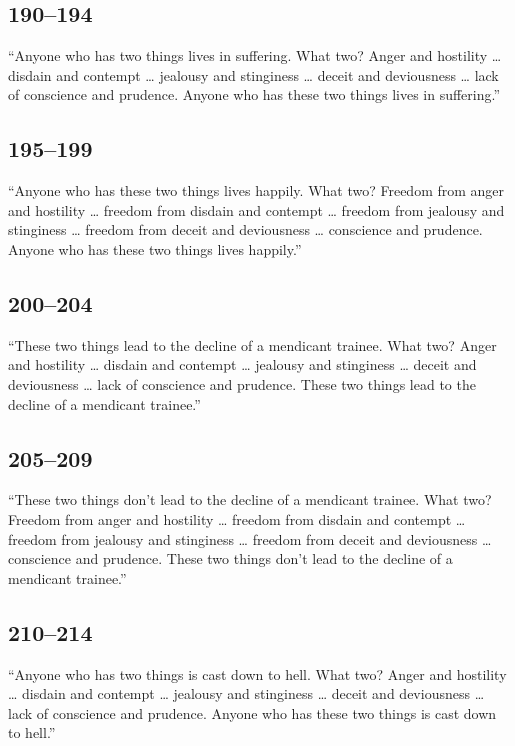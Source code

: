 \documentclass[12pt,openany]{book}%
\begin{document}
\subsection*{190–194 }

“Anyone who has two things lives in suffering. What two? Anger and hostility … disdain and contempt … jealousy and stinginess … deceit and deviousness … lack of conscience and prudence. Anyone who has these two things lives in suffering.” 

\subsection*{195–199 }

“Anyone who has these two things lives happily. What two? Freedom from anger and hostility … freedom from disdain and contempt … freedom from jealousy and stinginess … freedom from deceit and deviousness … conscience and prudence. Anyone who has these two things lives happily.” 

\subsection*{200–204 }

“These two things lead to the decline of a mendicant trainee. What two? Anger and hostility … disdain and contempt … jealousy and stinginess … deceit and deviousness … lack of conscience and prudence. These two things lead to the decline of a mendicant trainee.” 

\subsection*{205–209 }

“These two things don’t lead to the decline of a mendicant trainee. What two? Freedom from anger and hostility … freedom from disdain and contempt … freedom from jealousy and stinginess … freedom from deceit and deviousness … conscience and prudence. These two things don’t lead to the decline of a mendicant trainee.” 

\subsection*{210–214 }

“Anyone who has two things is cast down to hell. What two? Anger and hostility … disdain and contempt … jealousy and stinginess … deceit and deviousness … lack of conscience and prudence. Anyone who has these two things is cast down to hell.” 
\end{document}
